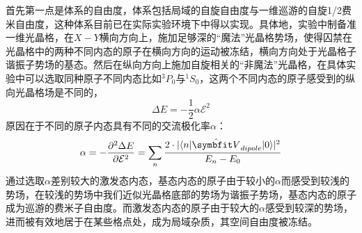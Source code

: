 首先第一点是体系的自由度，体系包括局域的自旋自由度与一维巡游的自旋1/2费米自由度，这种体系目前已在实际实验环境下中得以实现\cite{riegger2018localized}。具体地，实验中制备准一维光晶格，在$X-Y$横向方向上，施加足够深的{\color{red}“魔法”}光晶格势场，使得囚禁在光晶格中的两种不同内态的原子在横向方向的运动被冻结，横向方向处于光晶格子谐振子势场的基态。然后在纵向方向上施加自旋相关的“非魔法”光晶格，在具体实验中可以选取同种原子不同内态比如${}^3P_0$与${}^1S_0$，这两个不同内态的原子感受到的纵向光晶格场是不同的，
\begin{equation}
    \Delta E = -\frac{1}{2}\alpha\mathcal{E}^2
\end{equation}
原因在于不同的原子内态具有不同的交流极化率$\alpha$：
\begin{equation}
\alpha = -\frac{\partial^2\Delta E}{\partial \mathcal{E}^2} = \sum_{n} \frac{2\cdot|\langle n|\hat{\Vector{V}}_{dipole}|0\rangle|^2}{E_n-E_0}
\end{equation}
通过选取$\alpha$差别较大的激发态内态，基态内态的原子由于较小的$\alpha$而感受到较浅的势场，在较浅的势场中我们近似光晶格底部的势场为谐振子势场，基态内态的原子成为巡游的费米子自由度。而激发态内态的原子由于较大的$\alpha$感受到较深的势场，进而被有效地居于在某些格点处，成为局域杂质，其空间自由度被冻结。

